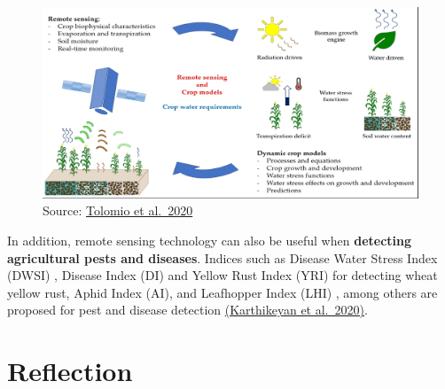 \documentclass[
  letterpaper,
  DIV=11,
  numbers=noendperiod]{scrreprt}
\begin{document}
\begin{figure}

{\centering \includegraphics{./image/application1.2.webp}

}

\caption{Source: \href{https://doi.org/10.3390/rs12233945}{Tolomio et
al.~2020}}

\end{figure}

In addition, remote sensing technology can also be useful when
\textbf{detecting agricultural pests and diseases}. Indices such as
Disease Water Stress Index (DWSI) , Disease Index (DI) and Yellow Rust
Index (YRI) for detecting wheat yellow rust, Aphid Index (AI), and
Leafhopper Index (LHI) , among others are proposed for pest and disease
detection
\href{https://doi.org/10.1016/j.jhydrol.2020.124905}{(Karthikeyan et
al.~2020)}.

\hypertarget{reflection}{%
\section{Reflection}\label{reflection}}
\end{document}
